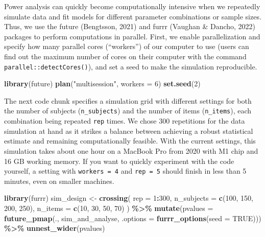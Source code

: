 \documentclass[
  man,floatsintext]{apa6}
\newenvironment{Shaded}{\begin{snugshade}}{\end{snugshade}}
\newcommand{\AttributeTok}[1]{\textcolor[rgb]{0.13,0.29,0.53}{#1}}
\newcommand{\ConstantTok}[1]{\textcolor[rgb]{0.56,0.35,0.01}{#1}}
\newcommand{\DecValTok}[1]{\textcolor[rgb]{0.00,0.00,0.81}{#1}}
\newcommand{\FunctionTok}[1]{\textcolor[rgb]{0.13,0.29,0.53}{\textbf{#1}}}
\newcommand{\NormalTok}[1]{#1}
\newcommand{\OtherTok}[1]{\textcolor[rgb]{0.56,0.35,0.01}{#1}}
\newcommand{\SpecialCharTok}[1]{\textcolor[rgb]{0.81,0.36,0.00}{\textbf{#1}}}
\newcommand{\StringTok}[1]{\textcolor[rgb]{0.31,0.60,0.02}{#1}}
\begin{document}
Power analysis can quickly become computationally intensive when we repeatedly simulate data and fit models for different parameter combinations or sample sizes. Thus, we use the future (Bengtsson, 2021) and furrr (Vaughan \& Dancho, 2022) packages to perform computations in parallel. First, we enable parallelization and specify how many parallel cores (``workers'') of our computer to use (users can find out the maximum number of cores on their computer with the command \texttt{parallel::detectCores()}), and set a seed to make the simulation reproducible.

\begin{Shaded}
\begin{Highlighting}[]
\FunctionTok{library}\NormalTok{(future)}
\FunctionTok{plan}\NormalTok{(}\StringTok{"multisession"}\NormalTok{, }\AttributeTok{workers =} \DecValTok{6}\NormalTok{)}
\FunctionTok{set.seed}\NormalTok{(}\DecValTok{2}\NormalTok{)}
\end{Highlighting}
\end{Shaded}

The next code chunk specifies a simulation grid with different settings for both the number of subjects (\texttt{n\_subjects}) and the number of items (\texttt{n\_items}), each combination being repeated \texttt{rep} times. We chose 300 repetitions for the data simulation at hand as it strikes a balance between achieving a robust statistical estimate and remaining computationally feasible.
With the current settings, this simulation takes about one hour on a MacBook Pro from 2020 with M1 chip and 16 GB working memory. If you want to quickly experiment with the code yourself, a setting with \texttt{workers\ =\ 4} and \texttt{rep\ =\ 5} should finish in less than 5 minutes, even on smaller machines.

\begin{Shaded}
\begin{Highlighting}[]
\FunctionTok{library}\NormalTok{(furrr)}
\NormalTok{sim\_design }\OtherTok{\textless{}{-}} \FunctionTok{crossing}\NormalTok{(}
  \AttributeTok{rep =} \DecValTok{1}\SpecialCharTok{:}\DecValTok{300}\NormalTok{,}
  \AttributeTok{n\_subjects =} \FunctionTok{c}\NormalTok{(}\DecValTok{100}\NormalTok{, }\DecValTok{150}\NormalTok{, }\DecValTok{200}\NormalTok{, }\DecValTok{250}\NormalTok{),}
  \AttributeTok{n\_items =} \FunctionTok{c}\NormalTok{(}\DecValTok{10}\NormalTok{, }\DecValTok{30}\NormalTok{, }\DecValTok{50}\NormalTok{, }\DecValTok{70}\NormalTok{)}
\NormalTok{) }\SpecialCharTok{\%\textgreater{}\%}
  \FunctionTok{mutate}\NormalTok{(}\AttributeTok{pvalues =} \FunctionTok{future\_pmap}\NormalTok{(., sim\_and\_analyse, }
    \AttributeTok{.options =} \FunctionTok{furrr\_options}\NormalTok{(}\AttributeTok{seed =} \ConstantTok{TRUE}\NormalTok{))) }\SpecialCharTok{\%\textgreater{}\%}
  \FunctionTok{unnest\_wider}\NormalTok{(pvalues)}
\end{Highlighting}
\end{Shaded}
\end{document}
